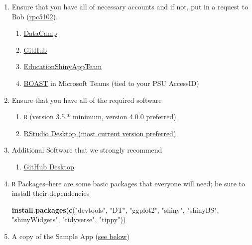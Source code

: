 \documentclass[
]{book}
\newenvironment{Shaded}{\begin{snugshade}}{\end{snugshade}}
\newcommand{\KeywordTok}[1]{\textcolor[rgb]{0.13,0.29,0.53}{\textbf{#1}}}
\newcommand{\NormalTok}[1]{#1}
\newcommand{\StringTok}[1]{\textcolor[rgb]{0.31,0.60,0.02}{#1}}
\providecommand{\tightlist}{%
  \setlength{\itemsep}{0pt}\setlength{\parskip}{0pt}}
\begin{document}
\begin{enumerate}
\def\labelenumi{\arabic{enumi}.}
\item
  Ensure that you have all of necessary accounts and if not, put in a request to Bob (\href{mailto:rpc5102@psu.edu}{rpc5102}).

  \begin{enumerate}
  \def\labelenumii{\alph{enumii}.}
  \tightlist
  \item
    \href{https://www.datacamp.com/}{DataCamp}\\
  \item
    \href{https://github.com/}{GitHub}\\
  \item
    \href{https://github.com/EducationShinyAppTeam}{EducationShinyAppTeam}
  \item
    \href{https://teams.microsoft.com/l/team/19\%3a8423bc25992a4451952d8312b497324d\%40thread.skype/conversations?groupId=a83c9d1b-6bcc-46f4-aa25-82b2fad862ec\&tenantId=7cf48d45-3ddb-4389-a9c1-c115526eb52e}{BOAST} in Microsoft Teams (tied to your PSU AccessID)
  \end{enumerate}
\item
  Ensure that you have all of the required software

  \begin{enumerate}
  \def\labelenumii{\alph{enumii}.}
  \tightlist
  \item
    \href{https://cloud.r-project.org/}{\texttt{R} (version 3.5.* minimum, version 4.0.0 preferred)}
  \item
    \href{https://rstudio.com/products/rstudio/download/\#download}{RStudio Desktop (most current version preferred)}
  \end{enumerate}
\item
  Additional Software that we strongly recommend

  \begin{enumerate}
  \def\labelenumii{\alph{enumii}.}
  \tightlist
  \item
    \href{https://desktop.github.com/}{GitHub Desktop}
  \end{enumerate}
\item
  \texttt{R} Packages--here are some basic packages that everyone will need; be sure to install their dependencies

\begin{Shaded}
\begin{Highlighting}[]
\KeywordTok{install.packages}\NormalTok{(}\KeywordTok{c}\NormalTok{(}\StringTok{"devtools"}\NormalTok{, }\StringTok{"DT"}\NormalTok{, }\StringTok{"ggplot2"}\NormalTok{, }\StringTok{"shiny"}\NormalTok{, }\StringTok{"shinyBS"}\NormalTok{, }
                   \StringTok{"shinyWidgets"}\NormalTok{, }\StringTok{"tidyverse"}\NormalTok{, }\StringTok{"tippy"}\NormalTok{))}
\end{Highlighting}
\end{Shaded}
\item
  A copy of the Sample App (\protect\hyperlink{sample-app}{see below})
\end{enumerate}
\end{document}
